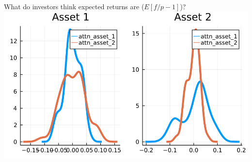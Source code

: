 \documentclass[
  ignorenonframetext,
]{beamer}
\begin{document}
\begin{frame}{What do investors think expected returns are
(\(E[f/p - 1]\))?}
\includegraphics[width=0.4\paperheight]{complexity_files/figure-beamer/unnamed-chunk-15-4}
\end{frame}
\end{document}

